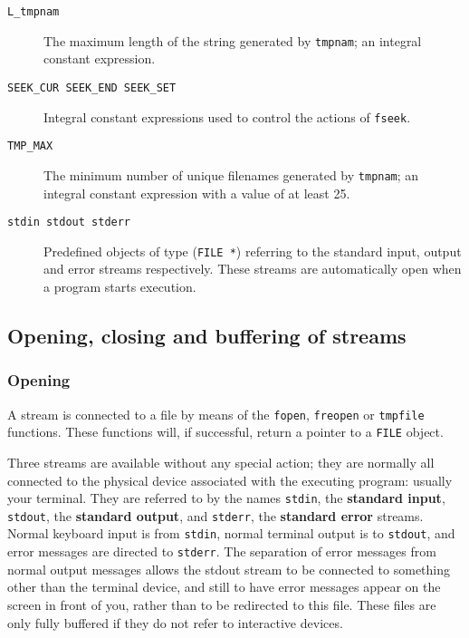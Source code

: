 \begin{description}
    \item[\texttt{L\_tmpnam}] The maximum length of the string generated by \texttt{tmpnam}; an
     integral constant expression.

    \item[\texttt{SEEK\_CUR SEEK\_END SEEK\_SET}] Integral constant expressions used to control the actions
     of \texttt{fseek}.

    \item[\texttt{TMP\_MAX}] The minimum number of unique filenames generated by
     \texttt{tmpnam}; an integral constant expression with a value of
     at least 25.

    \item[\texttt{stdin stdout stderr}] Predefined objects of type (\texttt{FILE *}) referring to the
     standard input, output and error streams respectively.
     These streams are automatically open when a program
     starts execution.
   \end{description}

  

  \subsection{Opening, closing and buffering of streams}
   

   \subsubsection{Opening}
    

    A stream is connected to a file by means of the \texttt{fopen},
     \texttt{freopen} or \texttt{tmpfile} functions.  These functions
     will, if successful, return a pointer to a \texttt{FILE} object.


    Three streams are available without any special action; they are
     normally all connected to the physical device associated with the
     executing program: usually your terminal.  They are referred to by the
     names \texttt{stdin}, the \textbf{standard input},
     \texttt{stdout}, the \textbf{standard output}, and
     \texttt{stderr}, the \textbf{standard error} streams.  Normal
     keyboard input is from \texttt{stdin}, normal terminal output is to
     \texttt{stdout}, and error messages are directed to
     \texttt{stderr}.  The separation of error messages from normal output
     messages allows the stdout stream to be connected to something other than
     the terminal device, and still to have error messages appear on the screen
     in front of you, rather than to be redirected to this file.  These files
     are only fully buffered if they do not refer to interactive devices.


